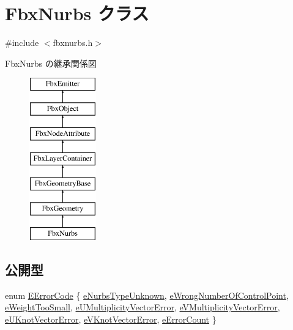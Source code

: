 \hypertarget{class_fbx_nurbs}{}\section{Fbx\+Nurbs クラス}
\label{class_fbx_nurbs}


{\ttfamily \#include $<$fbxnurbs.\+h$>$}

Fbx\+Nurbs の継承関係図\begin{figure}[H]
\begin{center}
\leavevmode
\includegraphics[height=7.000000cm]{class_fbx_nurbs}
\end{center}
\end{figure}
\subsection*{公開型}
\begin{DoxyCompactItemize}
\item 
enum \hyperlink{class_fbx_nurbs_a1ff85864ee6533b4b6d43537ec625a66}{E\+Error\+Code} \{ \newline
\hyperlink{class_fbx_nurbs_a1ff85864ee6533b4b6d43537ec625a66a01fe54ebb22d68039b935dc12cb21b83}{e\+Nurbs\+Type\+Unknown}, 
\hyperlink{class_fbx_nurbs_a1ff85864ee6533b4b6d43537ec625a66aaaae33f0afccdfa95a07c122a38ebf33}{e\+Wrong\+Number\+Of\+Control\+Point}, 
\hyperlink{class_fbx_nurbs_a1ff85864ee6533b4b6d43537ec625a66a4b31ff7d5ef981f92c5feff4a22f486b}{e\+Weight\+Too\+Small}, 
\hyperlink{class_fbx_nurbs_a1ff85864ee6533b4b6d43537ec625a66a0181fd0c91ed8468c636035f64bd061d}{e\+U\+Multiplicity\+Vector\+Error}, 
\newline
\hyperlink{class_fbx_nurbs_a1ff85864ee6533b4b6d43537ec625a66a0798e68b10240a4d23aaafbf36b5d613}{e\+V\+Multiplicity\+Vector\+Error}, 
\hyperlink{class_fbx_nurbs_a1ff85864ee6533b4b6d43537ec625a66a2d3f400bc97c95a4168ece3f64910bbf}{e\+U\+Knot\+Vector\+Error}, 
\hyperlink{class_fbx_nurbs_a1ff85864ee6533b4b6d43537ec625a66a6c64868e85a2725eedd4e3fa4e0c0263}{e\+V\+Knot\+Vector\+Error}, 
\hyperlink{class_fbx_nurbs_a1ff85864ee6533b4b6d43537ec625a66a64ca63e4e6ce550332041256bc6f7227}{e\+Error\+Count}
 \}
\end{DoxyCompactItemize}
